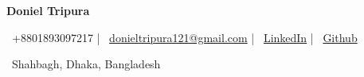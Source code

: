 \begin{center}
    {\Huge\textbf{Doniel Tripura}} \\  
    \small{\faPhone~+8801893097217 | \faEnvelope~\href{mailto:donieltripura121@gmail.com}{donieltripura121@gmail.com} | \faLinkedin~\href{https://www.linkedin.com/in/doniel-tripura-7a82281b9/}{LinkedIn} | \faGithub~\href{https://github.com/MachangDoniel}{Github}
    
    \faMapMarker~Shahbagh, Dhaka, Bangladesh}  
\end{center}

